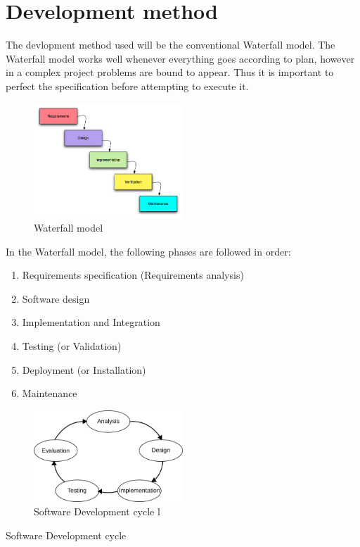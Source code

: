 \section{Development method}

The devlopment method used will be the conventional Waterfall model. The Waterfall model works well whenever everything goes according to plan, however in a complex project problems are bound to appear. Thus it is important to perfect the specification before attempting to execute it.
\begin{figure}[h]
	\centering
	\includegraphics[width=0.5\textwidth]{Images/development_method_waterfall_model.png}
	\caption{Waterfall model}
	\label{Waterfall}
\end{figure}

In the Waterfall model, the following phases are followed in order:
\begin{enumerate}
\item Requirements specification (Requirements analysis)
\item Software design
\item Implementation and Integration
\item Testing (or Validation)
\item Deployment (or Installation)
\item Maintenance
\end{enumerate}

\begin{figure}[h]
	\centering
	\includegraphics[width=0.5\textwidth]{Images/development_method_software_development_cycle.png}
	\caption{Software Development cycle l}
	\label{cyclel}
\end{figure}

Software Development cycle 
